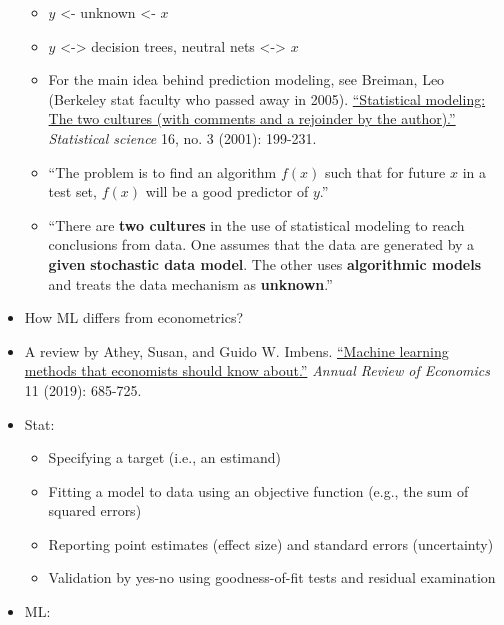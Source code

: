 \documentclass[
]{book}
\begin{document}
\begin{itemize}
  \begin{itemize}
  \item
    \(y\) \textless- unknown \textless- \(x\)
  \item
    \(y\) \textless-\textgreater{} decision trees, neutral nets \textless-\textgreater{} \(x\)
  \item
    For the main idea behind prediction modeling, see Breiman, Leo (Berkeley stat faculty who passed away in 2005). \href{https://projecteuclid.org/euclid.ss/1009213726}{``Statistical modeling: The two cultures (with comments and a rejoinder by the author).''} \emph{Statistical science} 16, no. 3 (2001): 199-231.
  \item
    ``The problem is to find an algorithm \(f(x)\) such that for future \(x\) in a test set, \(f(x)\) will be a good predictor of \(y\).''
  \item
    ``There are \textbf{two cultures} in the use of statistical modeling to reach conclusions from data. One assumes that the data are generated by a \textbf{given} \textbf{stochastic data model}. The other uses \textbf{algorithmic models} and treats the data mechanism as \textbf{unknown}.''
  \end{itemize}
\item
  How ML differs from econometrics?
\item
  A review by Athey, Susan, and Guido W. Imbens. \href{https://www.annualreviews.org/doi/full/10.1146/annurev-economics-080217-053433}{``Machine learning methods that economists should know about.''} \emph{Annual Review of Economics} 11 (2019): 685-725.
\item
  Stat:

  \begin{itemize}
  \item
    Specifying a target (i.e., an estimand)
  \item
    Fitting a model to data using an objective function (e.g., the sum of squared errors)
  \item
    Reporting point estimates (effect size) and standard errors (uncertainty)
  \item
    Validation by yes-no using goodness-of-fit tests and residual examination
  \end{itemize}
\item
  ML:


\end{itemize}
\end{document}
